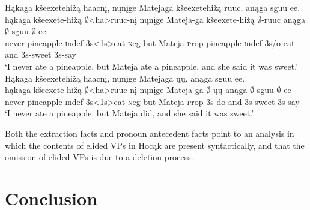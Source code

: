\documentclass[output=paper]{LSP/langsci}
\begin{document}
\begin{exe}
\ex
\begin{xlist}
\ex
\glll Hąkaga kšeexetehižą haacnį, nųnįge Matejaga kšeexetehižą ruuc, anąga sguu ee.\\
hąkaga kšeexete-hižą $\emptyset$<ha>ruuc-nį nųnįge Mateja-ga kšeexete-hižą $\emptyset$-ruuc anąga $\emptyset$-sguu $\emptyset$-ee\\
never pineapple-{\textsc indef} {\textsc 3s<1s>}eat-{\textsc neg} but Mateja-{\textsc prop} pineapple-{\textsc indef} {\textsc 3s/o}-eat and {\textsc 3s}-sweet {\textsc 3s}-say\\
\trans `I never ate a pineapple, but Mateja ate a pineapple, and she said it was sweet.'
\ex
\glll Hąkaga kšeexetehižą haacnį, nųnįge Matejaga ųų, anąga sguu ee.\\
hąkaga kšeexete-hižą $\emptyset$<ha>ruuc-nį nųnįge Mateja-ga $\emptyset$-ųų anąga $\emptyset$-sguu $\emptyset$-ee\\
never pineapple-{\textsc indef} {\textsc 3s<1s>}eat-{\textsc neg} but Mateja-{\textsc prop} {\textsc 3s}-do and {\textsc 3s}-sweet {\textsc 3s}-say\\
\trans `I never ate a pineapple, but Mateja did, and she said it was sweet.'
\end{xlist}
\end{exe}

\begin{exe}
\end{exe}


Both the extraction facts and pronoun antecedent facts point to an analysis in which the contents of elided VPs in Hocąk are present syntactically, and that the omission of elided VPs is due to a deletion process.

\section{Conclusion}
\end{document}

